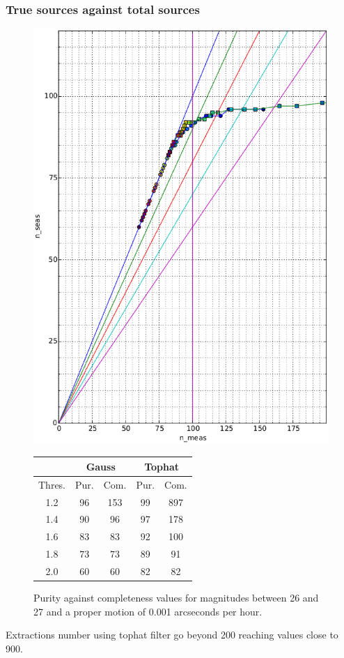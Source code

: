 \documentclass{article}
\begin{document}
\subsubsection{True sources against total sources}
\begin{figure}[H]
\centering
\includegraphics[width=.55\linewidth]{images/26_27_0_d.eps}
\qquad
\begin{tabular}[b]{|c|c|c|c|c|}\hline
\multicolumn{1}{|c|}{} & \multicolumn{2}{c|}{Gauss} & \multicolumn{2}{c|}{Tophat} \\
\hline \hline
Thres. & Pur. & Com. & Pur. & Com.\\
\hline
1.2 & 96 & 153 & 99 & 897\\
\hline
1.4 & 90 & 96 & 97 & 178\\
\hline
1.6 & 83 & 83 & 92 & 100\\
\hline
1.8 & 73 & 73 & 89 & 91\\
\hline
2.0 & 60 & 60 & 82 & 82\\
\hline
\end{tabular}
\captionsetup{labelformat=andtable}
\caption{Purity against completeness values for magnitudes between 26 and 27 and a proper motion of 0.001 arcseconds per hour.}
\end{figure}

Extractions number using tophat filter go beyond 200 reaching values close to 900. 
\end{document}
